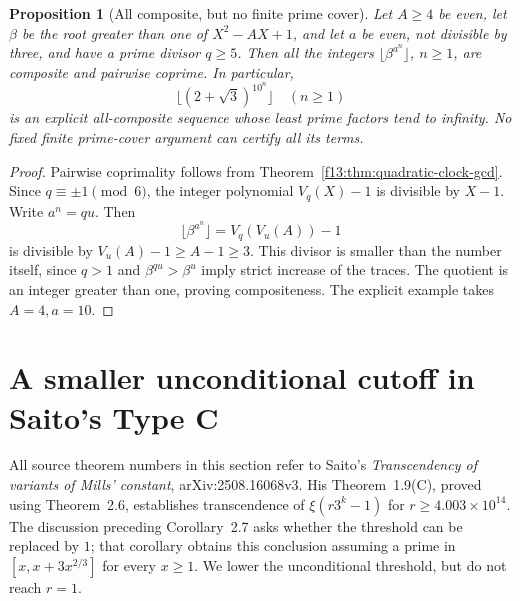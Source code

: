 \documentclass[11pt,a4paper]{article}
\newtheorem{proposition}[theorem]{Proposition}
\theoremstyle{definition}
\theoremstyle{remark}
\numberwithin{equation}{section}
\begin{document}
\begin{proposition}[All composite, but no finite prime cover]
\label{f13:prop:pairwise-composite-example}
Let $A\ge4$ be even, let $\beta$ be the root greater than one of
$X^2-AX+1$, and let $a$ be even, not divisible by three, and have a
prime divisor $q\ge5$.  Then all the integers
$\lfloor\beta^{a^n}\rfloor$, $n\ge1$, are composite and pairwise coprime.
In particular,
\[
 \boxed{\lfloor(2+\sqrt3)^{10^n}\rfloor\quad(n\ge1)}
\]
is an explicit all-composite sequence whose least prime factors tend to
infinity.  No fixed finite prime-cover argument can certify all its
terms.
\end{proposition}
\begin{proof}
Pairwise coprimality follows from Theorem~\ref{f13:thm:quadratic-clock-gcd}.
Since $q\equiv\pm1\pmod6$, the integer polynomial $V_q(X)-1$ is
divisible by $X-1$.  Write $a^n=qu$.  Then
\[
 \lfloor\beta^{a^n}\rfloor
   =V_q(V_u(A))-1
\]
is divisible by $V_u(A)-1\ge A-1\ge3$.  This divisor is smaller than
the number itself, since $q>1$ and $\beta^{qu}>\beta^u$ imply strict
increase of the traces.  The quotient is an integer greater than one,
proving compositeness.  The explicit example takes $A=4,a=10$.
\end{proof}


\section{A smaller unconditional cutoff in Saito's Type C}
\label{f13:sec:type-c-refined}

All source theorem numbers in this section refer to Saito's
\emph{Transcendency of variants of Mills' constant},
arXiv:2508.16068v3.  His Theorem~1.9(C), proved using Theorem~2.6,
establishes transcendence of $\xi(r3^k-1)$ for
$r\ge4.003\times10^{14}$.  The discussion preceding Corollary~2.7
asks whether the threshold can be replaced by $1$; that corollary
obtains this conclusion assuming a prime in $[x,x+3x^{2/3}]$ for
every $x\ge1$.  We lower the unconditional threshold, but do not
reach $r=1$.
\end{document}
